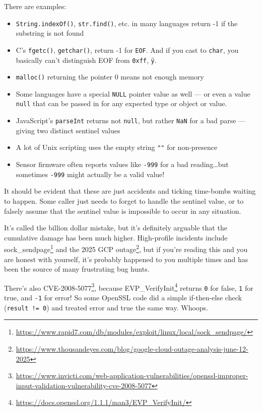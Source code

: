 \documentclass[]{article}
\renewcommand{\href}[2]{#2\footnote{\url{#1}}}
\begin{document}
There are examples:

\begin{itemize}
\tightlist
\item
  \texttt{String.indexOf()}, \texttt{str.find()}, etc. in many languages return
  -1 if the substring is not found
\item
  C's \texttt{fgetc()}, \texttt{getchar()}, return -1 for \texttt{EOF}. And if
  you cast to \texttt{char}, you basically can't distinguish EOF from
  \texttt{0xff}, \texttt{ÿ}.
\item
  \texttt{malloc()} returning the pointer 0 means not enough memory
\item
  Some languages have a special \texttt{NULL} pointer value as well --- or even
  a value \texttt{null} that can be passed in for any expected type or object or
  value.
\item
  JavaScript's \texttt{parseInt} returns not \texttt{null}, but rather
  \texttt{NaN} for a bad parse --- giving two distinct sentinel values
\item
  A lot of Unix scripting uses the empty string \texttt{""} for non-presence
\item
  Sensor firmware often reports values like \texttt{-999} for a bad
  reading\ldots but sometimes \texttt{-999} might actually be a valid value!
\end{itemize}

It should be evident that these are just accidents and ticking time-bombs
waiting to happen. Some caller just needs to forget to handle the sentinel
value, or to falsely assume that the sentinel value is impossible to occur in
any situation.

It's called the billion dollar mistake, but it's definitely arguable that the
cumulative damage has been much higher. High-profile incidents include
\href{https://www.rapid7.com/db/modules/exploit/linux/local/sock_sendpage/}{sock\_sendpage}
and the
\href{https://www.thousandeyes.com/blog/google-cloud-outage-analysis-june-12-2025}{2025
GCP outage}, but if you're reading this and you are honest with yourself, it's
probably happened to you multiple times and has been the source of many
frustrating bug hunts.

There's also
\href{https://www.invicti.com/web-application-vulnerabilities/openssl-improper-input-validation-vulnerability-cve-2008-5077}{CVE-2008-5077},
because
\href{https://docs.openssl.org/1.1.1/man3/EVP_VerifyInit/}{EVP\_VerifyInit}
returns \texttt{0} for false, \texttt{1} for true, and \texttt{-1} for error! So
some OpenSSL code did a simple if-then-else check (\texttt{result\ !=\ 0}) and
treated error and true the same way. Whoops.
\end{document}
